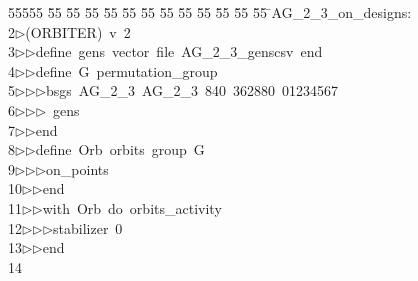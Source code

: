%
%
\begin{tabbing}
55555 \= 55 \= 55 \= 55 \= 55 \= 55 \= 55 \= 55 \= 55 \= 55 \= 55 \= 55 \= 55 \= \>AG\_2\_3\_on\_designs:\\[0pt]
2\>$\triangleright$\>(ORBITER)\ v\ 2\ \\[0pt]
3\>$\triangleright$\>$\triangleright$\>define\ gens\ vector\ file\ AG\_2\_3\_genscsv\ end\ \\[0pt]
4\>$\triangleright$\>$\triangleright$\>define\ G\ permutation\_group\ \\[0pt]
5\>$\triangleright$\>$\triangleright$\>$\triangleright$\>bsgs\ AG\_2\_3\ AG\_2\_3\ 840\ 362880\ 01234567\ \\[0pt]
6\>$\triangleright$\>$\triangleright$\>$\triangleright$\ gens\ \\[0pt]
7\>$\triangleright$\>$\triangleright$\>end\ \\[0pt]
8\>$\triangleright$\>$\triangleright$\>define\ Orb\ orbits\ group\ G\ \\[0pt]
9\>$\triangleright$\>$\triangleright$\>$\triangleright$\>on\_points\ \\[0pt]
10\>$\triangleright$\>$\triangleright$\>end\ \\[0pt]
11\>$\triangleright$\>$\triangleright$\>with\ Orb\ do\ orbits\_activity\ \\[0pt]
12\>$\triangleright$\>$\triangleright$\>$\triangleright$\>stabilizer\ 0\ \\[0pt]
13\>$\triangleright$\>$\triangleright$\>end\\[0pt]
14\>\end{tabbing}
